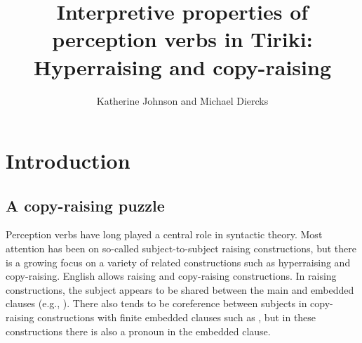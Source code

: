\documentclass[output=paper,colorlinks,citecolor=brown
]{langscibook}
\author{Katherine Johnson{}\affiliation{Stanford University} and Michael Diercks{}\affiliation{Pomona College}}
\title[Interpretive properties of perception verbs in Tiriki]{Interpretive properties of perception verbs in Tiriki: Hyperraising and copy-raising}
\begin{document}
\maketitle








\section{Introduction} \label{sec:johnson:intro}

\subsection{A copy-raising puzzle} \label{sec:johnson:puzzle}

Perception verbs have long played a central role in syntactic theory. Most attention has been on so-called subject-to-subject raising constructions, but there is a growing focus on a variety of related constructions such as hyperraising and copy-raising. English allows raising and copy-raising constructions. In raising constructions, the subject appears to be shared between the main and embedded clauses (e.g., ). There also tends to be coreference between subjects in copy-raising constructions with finite embedded clauses such as , but in these constructions there is also a pronoun in the embedded clause.
\end{document}
